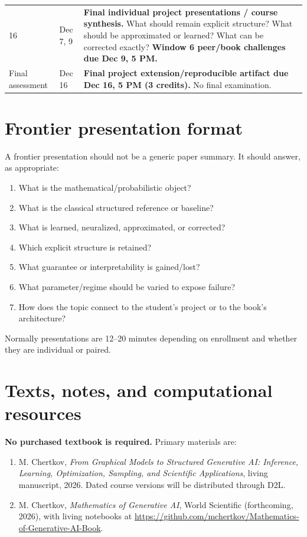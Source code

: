 \documentclass[11pt]{article}
\newcommand{\booktitle}{From Graphical Models to Structured Generative AI: Inference, Learning, Optimization, Sampling, and Scientific Applications}
\begin{document}
\begin{longtable}{p{1.45cm} p{2.75cm} p{8.9cm}}
16 & Dec 7, 9 & \textbf{Final individual project presentations / course synthesis.} What should remain explicit structure? What should be approximated or learned? What can be corrected exactly? \textbf{Window 6 peer/book challenges due Dec 9, 5 PM.}\\

Final assessment & Dec 16 & \textbf{Final project extension/reproducible artifact due Dec 16, 5 PM (3 credits).} No final examination.\\

\bottomrule
\end{longtable}
\normalsize

\section*{Frontier presentation format}

A frontier presentation should not be a generic paper summary. It should answer, as appropriate:
\begin{enumerate}
\item What is the mathematical/probabilistic object?
\item What is the classical structured reference or baseline?
\item What is learned, neuralized, approximated, or corrected?
\item Which explicit structure is retained?
\item What guarantee or interpretability is gained/lost?
\item What parameter/regime should be varied to expose failure?
\item How does the topic connect to the student's project or to the book's architecture?
\end{enumerate}
Normally presentations are 12--20 minutes depending on enrollment and whether they are individual or paired.

\section*{Texts, notes, and computational resources}

\textbf{No purchased textbook is required.} Primary materials are:
\begin{enumerate}
\item M. Chertkov, \emph{\booktitle}, living manuscript, 2026. Dated course versions will be distributed through D2L.
\item M. Chertkov, \emph{Mathematics of Generative AI}, World Scientific (forthcoming, 2026), with living notebooks at \url{https://github.com/mchertkov/Mathematics-of-Generative-AI-Book}.
\end{enumerate}
\end{document}
